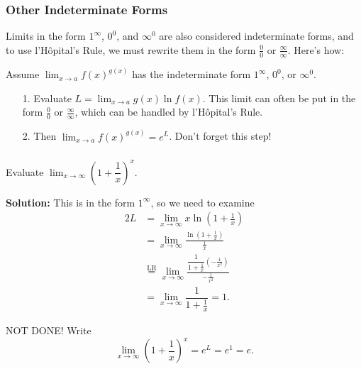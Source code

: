 \documentclass[14pt]{beamer}
\begin{document}
\begin{frame}
\frametitle{\small Other Indeterminate Forms}
\footnotesize
Limits in the form $1^{\infty}$, $0^0$, and $\infty^0$ are also considered indeterminate forms, and to use l'H\^{o}pital's Rule, we must rewrite them in the form $\frac{0}{0}$ or $\frac{\infty}{\infty}$.  Here's how:

\vspace{1pc}
Assume $\displaystyle\lim_{x \to a} f(x)^{g(x)}$ has the indeterminate form $1^{\infty}$, $0^0$, or $\infty^0$.
\begin{itemize}
\item[1.] Evaluate $L=\displaystyle\lim_{x \to a} g(x) \ln f(x)$.  This limit can often be put in the form $\frac{0}{0}$ or $\frac{\infty}{\infty}$, which can be handled by l'H\^{o}pital's Rule.
\item[2.] Then $\displaystyle\lim_{x \to a} f(x)^{g(x)}=e^L$. \alert{Don't forget this step!}
\end{itemize}
\end{frame}

\begin{frame}
\frametitle{}
\small
\begin{ex} Evaluate $\displaystyle\lim_{x \to \infty} \left( 1+\dfrac{1}{x} \right)^x$. \end{ex}
\footnotesize
{\bf Solution:}  This is in the form $1^{\infty}$, so we need to examine
\begin{alignat*}{2}
L &= \lim_{x \to \infty} x \ln \left( 1 + \frac{1}{x} \right) \\
 &= \lim_{x \to \infty} \frac{\ln \left( 1 + \frac{1}{x} \right)}{ \frac{1}{x}} \\
 &\overset{\text{LR}}{=} \lim_{x \to \infty} \frac{ \dfrac{1}{1+ \frac{1}{x}}\left(-\frac{1}{x^2}\right) }{- \frac{1}{x^2}} \\ 
&= \lim_{x \to \infty} \dfrac{1}{1+ \frac{1}{x}} = 1.
\end{alignat*}
\end{frame}

\begin{frame}
NOT DONE!  Write
\[\lim_{x \to \infty} \left( 1+\dfrac{1}{x} \right)^x = e^L = e^1 = e.\]
\end{frame}
\end{document}

